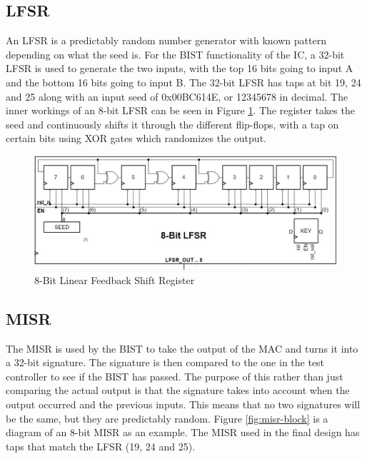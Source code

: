 \documentclass[11pt]{article}
\begin{document}
	\subsection{LFSR}
	
		An LFSR is a predictably random number generator with known pattern depending on what the seed is. For the BIST functionality of the IC, a 32-bit LFSR is used to generate the two inputs, with the top 16 bits going to input A and the bottom 16 bits going to input B. The 32-bit LFSR has taps at bit 19, 24 and 25 along with an input seed of 0x00BC614E, or 12345678 in decimal. The inner workings of an 8-bit LFSR can be seen in Figure \ref{fig:lfsr-block}. The register takes the seed and continuously shifts it through the different flip-flops, with a tap on certain bits using XOR gates which randomizes the output.
		
		\begin{figure}[H]
			\centering
			\includegraphics[width=\textwidth,height=\dimexpr\textheight-4\baselineskip-\abovecaptionskip-\belowcaptionskip\relax,keepaspectratio]{Pictures/LFSR}
			\caption{8-Bit Linear Feedback Shift Register}
			\label{fig:lfsr-block}
		\end{figure}
	
	\subsection{MISR}
	
		The MISR is used by the BIST to take the output of the MAC and turns it into a 32-bit signature. The signature is then compared to the one in the test controller to see if the BIST has passed. The purpose of this rather than just comparing the actual output is that the signature takes into account when the output occurred and the previous inputs. This means that no two signatures will be the same, but they are predictably random. Figure \ref{fig:misr-block} is a diagram of an 8-bit MISR as an example. The MISR used in the final design has taps that match the LFSR (19, 24 and 25).  
	
\end{document}

